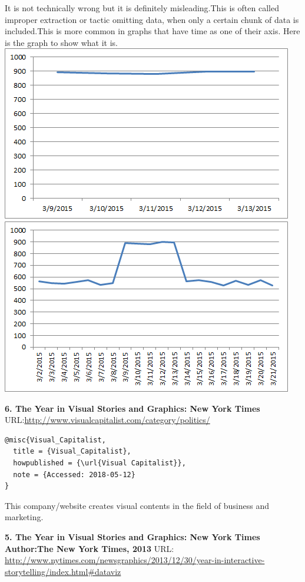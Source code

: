 \documentclass[]{book}
\theoremstyle{definition}
\theoremstyle{definition}
\theoremstyle{definition}
\theoremstyle{remark}
\begin{document}
It is not technically wrong but it is definitely misleading.This is
often called improper extraction or tactic omitting data, when only a
certain chunk of data is included.This is more common in graphs that
have time as one of their axis. Here is the graph to show what it is.
\includegraphics{images/Bad_graph_extraction.png}
\includegraphics{images/Good_graph_extraction.png}

\textbf{6. The Year in Visual Stories and Graphics: New York Times}
URL:\url{http://www.visualcapitalist.com/category/politics/}
\citep{Visual_Capitalist}

\begin{verbatim}
@misc{Visual_Capitalist,
  title = {Visual_Capitalist},
  howpublished = {\url{Visual Capitalist}},
  note = {Accessed: 2018-05-12}
}
\end{verbatim}

This company/website creates visual contents in the field of business
and marketing.

\textbf{5. The Year in Visual Stories and Graphics: New York Times}
\textbf{Author:The New York Times, 2013} URL:
\url{http://www.nytimes.com/newsgraphics/2013/12/30/year-in-interactive-storytelling/index.html\#dataviz}
\citep{The_Year_in_Visual_Stories_and_Graphics}
\end{document}
